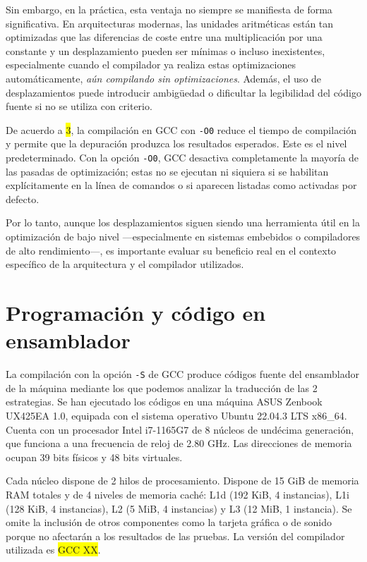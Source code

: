 \documentclass[11pt,a4paper,twoside]{article}
\theoremstyle{definition}
\begin{document}
	Sin embargo, en la práctica, esta ventaja no siempre se manifiesta de forma significativa. En arquitecturas modernas, las unidades aritméticas están tan optimizadas que las diferencias de coste entre una multiplicación por una constante y un desplazamiento pueden ser mínimas o incluso inexistentes, especialmente cuando el compilador ya realiza estas optimizaciones automáticamente, \textit{aún compilando sin optimizaciones}. Además, el uso de desplazamientos puede introducir ambigüedad o dificultar la legibilidad del código fuente si no se utiliza con criterio.
	
	De acuerdo a \colorbox{yellow}{3}, la compilación en GCC con \texttt{-O0} reduce el tiempo de compilación y permite que la depuración produzca los resultados esperados. Este es el nivel predeterminado. Con la opción \texttt{-O0}, GCC desactiva completamente la mayoría de las pasadas de optimización; estas no se ejecutan ni siquiera si se habilitan explícitamente en la línea de comandos o si aparecen listadas como activadas por defecto.
	
	Por lo tanto, aunque los desplazamientos siguen siendo una herramienta útil en la optimización de bajo nivel ---especialmente en sistemas embebidos o compiladores de alto rendimiento---, es importante evaluar su beneficio real en el contexto específico de la arquitectura y el compilador utilizados.
	
	
	\section{Programación y código en ensamblador}
	
	La compilación con la opción \texttt{-S} de GCC produce códigos fuente del ensamblador de la máquina mediante los que podemos analizar la traducción de las 2 estrategias. Se han ejecutado los códigos en una máquina ASUS Zenbook UX425EA 1.0, equipada con el sistema operativo Ubuntu 22.04.3 LTS x86\_64. Cuenta con un procesador Intel i7-1165G7 de 8 núcleos de undécima generación, que funciona a una frecuencia de reloj de 2.80 GHz. Las direcciones de memoria ocupan 39 bits físicos y 48 bits virtuales.
	
	Cada núcleo dispone de 2 hilos de procesamiento. Dispone de 15 GiB de memoria RAM totales y de 4 niveles de memoria caché: L1d (192 KiB, 4 instancias), L1i (128 KiB, 4 instancias), L2 (5 MiB, 4 instancias) y L3 (12 MiB, 1 instancia). Se omite la inclusión de otros componentes como la tarjeta gráfica o de sonido porque no afectarán a los resultados de las pruebas. La versión del compilador utilizada es \colorbox{yellow}{GCC XX}.
\end{document}
